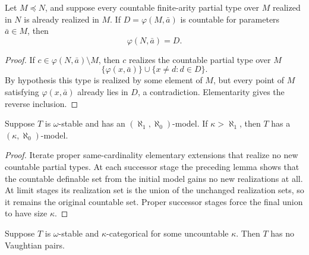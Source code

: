 \begin{lemma}
\label{lem:no-new-countable-types-preserve-countable-definable-sets}
Let \(M\preceq N\), and suppose every countable finite-arity partial type
over \(M\) realized in \(N\) is already realized in \(M\).  If
\(D=\varphi(M,\bar a)\) is countable for parameters \(\bar a\in M\),
then
\[
  \varphi(N,\bar a)=D.
\]
\end{lemma}

\begin{proof}
If \(c\in\varphi(N,\bar a)\setminus M\), then \(c\) realizes the
countable partial type over \(M\)
\[
  \{\varphi(x,\bar a)\}\cup\{x\neq d:d\in D\}.
\]
By hypothesis this type is realized by some element of \(M\), but every
point of \(M\) satisfying \(\varphi(x,\bar a)\) already lies in \(D\),
a contradiction.  Elementarity gives the reverse inclusion.
\end{proof}

\begin{theorem}
\label{thm:two-cardinal-transfer}
Suppose \(T\) is \(\omega\)-stable and has an
\((\aleph_1,\aleph_0)\)-model.  If \(\kappa>\aleph_1\), then \(T\) has
a \((\kappa,\aleph_0)\)-model.
\end{theorem}

\begin{proof}
Iterate proper same-cardinality elementary extensions that realize no new
countable partial types.  At each successor stage the preceding lemma
shows that the countable definable set from the initial model gains no
new realizations at all.  At limit stages its realization set is the
union of the unchanged realization sets, so it remains the original
countable set.  Proper successor stages force the final union to have
size \(\kappa\).
\end{proof}

\begin{theorem}
\label{thm:uncountable-categoricity-no-vaughtian-pairs}
Suppose \(T\) is \(\omega\)-stable and \(\kappa\)-categorical for some
uncountable \(\kappa\).  Then \(T\) has no Vaughtian pairs.
\end{theorem}

